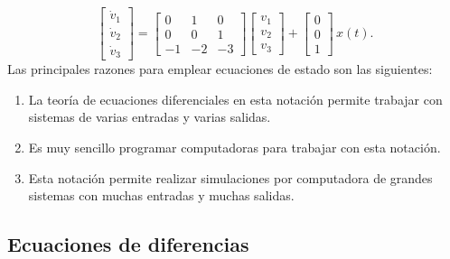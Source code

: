 \documentclass[11pt,a4paper,openany]{book}
\begin{document}
\begin{equation}
	\begin{bmatrix}
		\dot{v}_{1} \\
		\dot{v}_{2} \\
		\dot{v}_{3}
	\end{bmatrix} 
	= \begin{bmatrix}
		0 & 1 & 0 \\
		0 & 0 & 1 \\
		-1 & -2 & -3
	\end{bmatrix} 
	\begin{bmatrix}
		v_{1}\\
		v_{2}\\
		v_{3}
	\end{bmatrix}
	+
	\begin{bmatrix}
		0 \\
		0 \\
		1
	\end{bmatrix} \, x(t).
\end{equation}
Las principales razones para emplear ecuaciones de estado son las siguientes:
\begin{enumerate}
	\item La teoría de ecuaciones diferenciales en esta notación permite trabajar con sistemas de varias entradas y varias salidas.
	\item Es muy sencillo programar computadoras para trabajar con esta notación.
	\item Esta notación permite realizar simulaciones por computadora de grandes sistemas con muchas entradas y muchas salidas.
\end{enumerate}

\subsection{Ecuaciones de diferencias}
\end{document}
